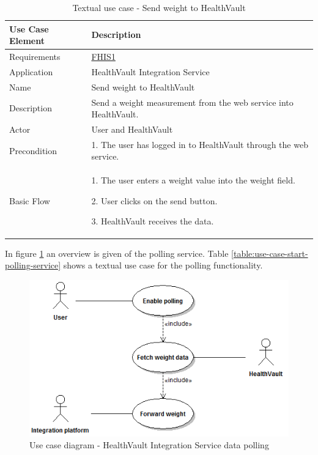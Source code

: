 \begin{table}[H]
\begin{center}
\begin{tabular}{ l | p{10cm} }
  \hline
  \textbf{Use Case Element} & \textbf{Description} \\ \hline\hline
  Requirements & \hyperref[table:reqwebservice]{FHIS1}\\ \hline
  Application & HealthVault Integration Service \\ \hline
  Name & Send weight to HealthVault \\ \hline
  Description & Send a weight measurement from the web service into HealthVault. \\ \hline
  Actor & User and HealthVault\\ \hline
  Precondition &
    \par 1. The user has logged in to HealthVault through the web service.
  \\ \hline
  Basic Flow & 
  	\par 1. The user enters a weight value into the weight field.
  	\par 2. User clicks on the send button.
  	\par 3. HealthVault receives the data.
  \\ \hline
\end{tabular}
\end{center}
\caption{Textual use case - Send weight to HealthVault}
\label{table:use-case-send-weight-to-healthvault}
\end{table}

In figure \ref{figure:use-case-diagram-weight-service-poll} an overview is given of the polling service.
Table \ref{table:use-case-start-polling-service} shows a textual use case for the polling functionality.

\begin{figure}[H]
\centering
\includegraphics[scale=0.75]{../Figures/use-case-diagram-weight-service-poll.png}
\caption{Use case diagram - HealthVault Integration Service data polling}
\label{figure:use-case-diagram-weight-service-poll}
\end{figure}

